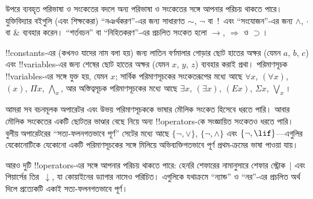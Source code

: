 \documentclass[../../../include/open-logic-section]{subfiles}
\begin{document}

\begin{intro}
উপরে ব্যবহৃত পরিভাষা ও সংকেতের বদলে অন্য পরিভাষা ও সংকেতের সঙ্গে আপনার
পরিচয় থাকতে পারে। যুক্তিবিদ্যার বইগুলি (এবং শিক্ষকেরা) “নঞর্থকরণ”-এর
জন্য সাধারণত $\sim$, $\neg$ বা~!\ এবং “সংযোজন”-এর জন্য $\wedge$,
$\cdot$ বা $\&$ ব্যবহার করেন। “শর্তবচন” বা “নিহিতকরণ”-এর প্রচলিত
সংকেত হলো $\rightarrow$, $\Rightarrow$ ও $\supset$।

!!{constant}s-এর (কখনও যাদের নাম বলা হয়) জন্য লাতিন বর্ণমালার গোড়ার
ছোট হাতের অক্ষর (যেমন $a$, $b$, $c$) এবং !!{variable}s-এর জন্য শেষের
ছোট হাতের অক্ষর (যেমন $x$, $y$, $z$) ব্যবহার করাই প্রথা। পরিমাণসূচক
!!{variable}s-এর সঙ্গে যুক্ত হয়, যেমন $x$; সার্বিক পরিমাণসূচকের
সংকেতরূপের মধ্যে আছে $\forall x$, $(\forall x)$, $(x)$, $\Pi x$,
$\bigwedge_x$, আর অস্তিত্বসূচক পরিমাণসূচকের মধ্যে আছে $\exists x$,
$(\exists x)$, $(Ex)$, $\Sigma x$, $\bigvee_x$।
\end{intro}

\begin{explain}
আমরা সব বচনমূলক অপারেটর এবং উভয় পরিমাণসূচককে ভাষার মৌলিক সংকেত
হিসেবে ধরতে পারি। আবার মৌলিক সংকেতের একটি ছোটতর ভাণ্ডার বেছে নিয়ে
অন্য !!{operator}s-কে সংজ্ঞায়িত সংকেতও ধরতে পারি। বুলীয় অপারেটরের
“সত্য-ফলনগতভাবে পূর্ণ” সেটের মধ্যে আছে $\{ \lnot, \lor \}$,
$\{ \lnot, \land \}$ এবং $\{ \lnot, \lif\}$—এগুলির যেকোনোটিকে
যেকোনো একটি পরিমাণসূচকের সঙ্গে মিলিয়ে অভিব্যক্তিগতভাবে পূর্ণ
প্রথম-ক্রমের ভাষা পাওয়া যায়।

আরও দুটি !!{operator}s-এর সঙ্গে আপনার পরিচয় থাকতে পারে: হেনরি শেফারের
নামানুসারে শেফার স্ট্রোক~$|$ এবং পিয়ার্সের তির~$\downarrow$, যা
কোয়াইনের ড্যাগার নামেও পরিচিত। এগুলিকে যথাক্রমে “ন্যান্ড” ও “নর”-এর
প্রচলিত অর্থ দিলে প্রত্যেকটি একাই সত্য-ফলনগতভাবে পূর্ণ।
\end{explain}
\end{document}
